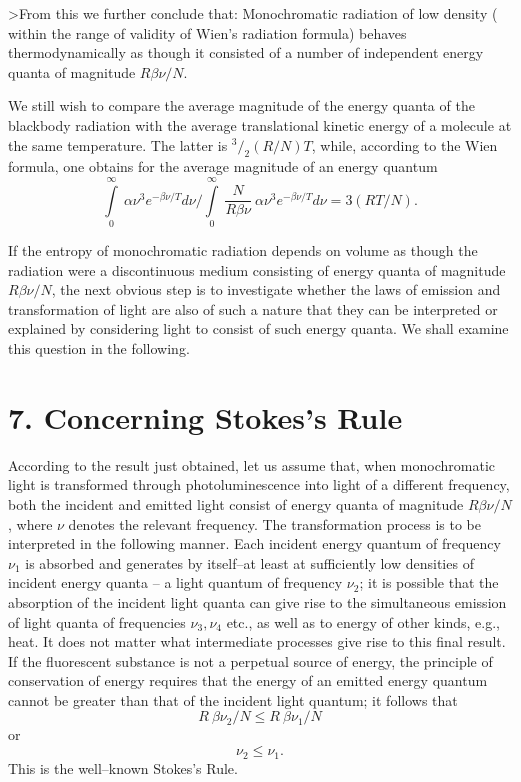 \documentclass[12pt]{article}
\begin{document}
>From this we further conclude that: Monochromatic radiation of low density (
within the range of validity of Wien's radiation formula) behaves
thermodynamically as though it consisted of a number of independent energy
quanta of magnitude $R \beta \nu/N$.

We still wish to compare the average magnitude of the energy quanta of the
blackbody radiation with the average translational kinetic energy of a molecule
at the same temperature. The latter is 
$^3/_2 (R/N)  T$, while,
according to the Wien formula, one obtains for the average magnitude of an
energy quantum
$$
\int \limits^{\infty}_0~ \alpha \nu^3 e^{- \beta \nu/T} d\nu\bigg/
\int \limits^{\infty}_0~ \frac{N}{R \beta \nu} ~ \alpha \nu^3 
e^{- \beta \nu/ T} d \nu = 3 (RT/N).
$$

If the entropy of monochromatic radiation depends on volume as though the
radiation were a discontinuous medium consisting of energy quanta of magnitude $
R \beta \nu/N$, the next obvious step is to investigate whether the laws of
emission and transformation of light are also of such a nature that they can be
interpreted or explained  by considering light to consist of such energy quanta.
We shall examine this question in the following.

\vspace{0.5cm}
\section*{
{\bf 7. Concerning Stokes's Rule}}
\vspace{0.5cm}

According to the result just obtained, let us assume that, when monochromatic
light is transformed through photoluminescence into light of a different
frequency, both the incident and emitted light consist of energy quanta of
magnitude $R \beta \nu/N$, where $\nu$ denotes the relevant frequency. The
transformation process is to be interpreted in the following manner. Each
incident energy quantum of frequency $\nu_1$ is absorbed and generates by 
itself--at least at sufficiently low densities of incident energy quanta -- a
light quantum of frequency $\nu_2$; it is possible that the absorption of the
incident light quanta can give rise to the simultaneous emission of light quanta
of frequencies $\nu_3, \nu_4$ etc., as well as to energy of other kinds, e.g.,
heat. It does not matter what intermediate processes give rise to this final
result. If the fluorescent substance is not a perpetual source of energy, the
principle of conservation of energy requires that the energy of an emitted
energy quantum cannot be greater than that of the incident light quantum; it
follows that 
$$
R~ \beta \nu_2/N \leq R~ \beta \nu_1/N
$$
or
$$ 
\nu_2 \leq \nu_1.
$$
This is the well--known Stokes's Rule.
\end{document}
